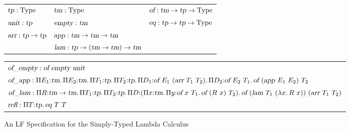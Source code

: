 \begin{figure*}[htbp]

\begin{tabular}{lll}
  $\mbox{\sl tp}:\mbox{Type}$\quad &
     \quad $\mbox{\sl tm}:\mbox{Type}$ \quad &
     \quad $\mbox{\sl of}:\mbox{\sl tm}\rightarrow \mbox{\sl tp}\rightarrow \mbox{Type}$ \\

  $\mbox{\sl unit}:\mbox{\sl tp}$ \quad &
     \quad $\mbox{\sl empty}:\mbox{\sl tm}$ \quad &
     \quad $\mbox{\sl eq}:\mbox{\sl tp}\rightarrow \mbox{\sl tp}\rightarrow \mbox{Type}$ \\

  $\mbox{\sl arr}:\mbox{\sl tp}\rightarrow \mbox{\sl tp}$ \quad &
     \quad $\mbox{\sl app}:\mbox{\sl tm}\rightarrow \mbox{\sl tm}\rightarrow \mbox{\sl tm}$ \quad & \\

  \quad &
     \quad
        $\mbox{\sl lam}:\mbox{\sl tp}\rightarrow (\mbox{\sl tm}\rightarrow \mbox{\sl tm})\rightarrow \mbox{\sl tm}$ \quad & \\
\end{tabular}

\begin{tabular}{l}
  $\mbox{\sl of\_empty}:\mbox{\sl of}\ \mbox{\sl empty}\ \mbox{\sl unit}$ \\

  $\mbox{\sl of\_app}:\Pi {E_1}{:}{\mbox{\sl tm}}.{\mkern 3mu} \Pi {E_2}{:}{\mbox{\sl tm}}.{\mkern 3mu} \Pi {T_1}{:}{\mbox{\sl tp}}.{\mkern 3mu} \Pi {T_2}{:}{\mbox{\sl tp}}.{\mkern 3mu} \Pi {D_1}{:}{\mbox{\sl of}\ E_1\ (\mbox{\sl arr}\ T_1\ T_2)}.{\mkern 3mu} \Pi {D_2}{:}{\mbox{\sl of}\ E_2\ T_1}.{\mkern 3mu} \mbox{\sl of}\ (\mbox{\sl app}\  E_1\  E_2)\  T_2$

  \\
  $\mbox{\sl of\_lam}:\Pi {R}{:}{\mbox{\sl tm}\rightarrow \mbox{\sl tm}}.{\mkern 3mu} \Pi {T_1}{:}{\mbox{\sl tp}}.{\mkern 3mu} \Pi {T_2}{:}{\mbox{\sl tp}}.{\mkern 3mu} \Pi {D}{:}{(\Pi {x}{:}{\mbox{\sl tm}}.{\mkern 3mu} \Pi {y}{:}{\mbox{\sl of}\ x\ T_1}.{\mkern 3mu} \mbox{\sl of}\ (R\ x)\ T_2)}.{\mkern 3mu} \mbox{\sl of}\ (\mbox{\sl lam}\  T_1\ (\lambda {x}.{\mkern 3mu} R\  x))
                                                 \ (\mbox{\sl arr}\  T_1\  T_2)$
  \\
  $\mbox{\sl refl}:\Pi {T}{:}{\mbox{\sl tp}}.{\mkern 3mu} \mbox{\sl eq}\  T\  T$
\end{tabular}
\caption{An LF Specification for the Simply-Typed Lambda Calculus}
\label{fig:stlc-term-spec}
\end{figure*}

